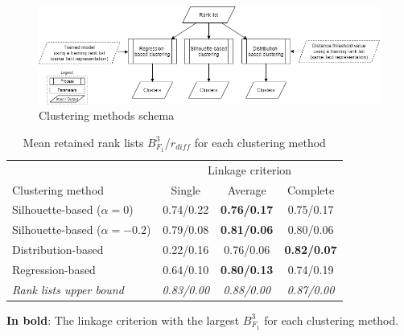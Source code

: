\begin{figure}
  \centering
  \caption{Clustering methods schema}
  \label{fig:schema-clustering}
  \includegraphics[width=1\linewidth]{img/schema-clustering.png}
\end{figure}

\begin{table}[t]
  \centering
  \caption{Mean retained rank lists $B^{3}_{F_1}$/$r_{diff}$ for each clustering method}
  \label{tab:clustering_evaluation_summary}
  \begin{tabular}{l c c c}
    \toprule
                                       & \multicolumn{3}{c}{Linkage criterion} \\
    Clustering method                  & Single         & Average            & Complete \\
    \midrule
    Silhouette-based ($\alpha = 0$)    & 0.74/0.22      & \textbf{0.76/0.17} & 0.75/0.17 \\
    Silhouette-based ($\alpha = -0.2$) & 0.79/0.08      & \textbf{0.81/0.06} & 0.80/0.06 \\
    Distribution-based                 & 0.22/0.16      & 0.76/0.06          & \textbf{0.82/0.07} \\
    Regression-based                   & 0.64/0.10      & \textbf{0.80/0.13} & 0.74/0.19 \\
    \midrule
    \textit{Rank lists upper bound}    & \textit{0.83/0.00} & \textit{0.88/0.00} & \textit{0.87/0.00} \\
    \bottomrule
  \end{tabular}

  \vspace{0.2cm}
  \textbf{In bold}: The linkage criterion with the largest $B^{3}_{F_1}$ for each clustering method.
\end{table}
